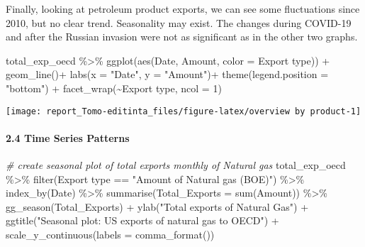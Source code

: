 \documentclass[
]{article}
\newenvironment{Shaded}{\begin{snugshade}}{\end{snugshade}}
\newcommand{\AttributeTok}[1]{\textcolor[rgb]{0.77,0.63,0.00}{#1}}
\newcommand{\CommentTok}[1]{\textcolor[rgb]{0.56,0.35,0.01}{\textit{#1}}}
\newcommand{\DecValTok}[1]{\textcolor[rgb]{0.00,0.00,0.81}{#1}}
\newcommand{\FunctionTok}[1]{\textcolor[rgb]{0.00,0.00,0.00}{#1}}
\newcommand{\NormalTok}[1]{#1}
\newcommand{\SpecialCharTok}[1]{\textcolor[rgb]{0.00,0.00,0.00}{#1}}
\newcommand{\StringTok}[1]{\textcolor[rgb]{0.31,0.60,0.02}{#1}}
\begin{document}
Finally, looking at petroleum product exports, we can see some
fluctuations since 2010, but no clear trend. Seasonality may exist. The
changes during COVID-19 and after the Russian invasion were not as
significant as in the other two graphs.

\begin{Shaded}
\begin{Highlighting}[]
\NormalTok{total\_exp\_oecd }\SpecialCharTok{\%\textgreater{}\%}  
  \FunctionTok{ggplot}\NormalTok{(}\FunctionTok{aes}\NormalTok{(Date, Amount, }\AttributeTok{color =} \StringTok{\textasciigrave{}}\AttributeTok{Export type}\StringTok{\textasciigrave{}}\NormalTok{)) }\SpecialCharTok{+}
  \FunctionTok{geom\_line}\NormalTok{()}\SpecialCharTok{+}
  \FunctionTok{labs}\NormalTok{(}\AttributeTok{x =} \StringTok{"Date"}\NormalTok{, }\AttributeTok{y =} \StringTok{"Amount"}\NormalTok{)}\SpecialCharTok{+}
  \FunctionTok{theme}\NormalTok{(}\AttributeTok{legend.position =} \StringTok{"bottom"}\NormalTok{) }\SpecialCharTok{+}
  \FunctionTok{facet\_wrap}\NormalTok{(}\SpecialCharTok{\textasciitilde{}}\StringTok{\textasciigrave{}}\AttributeTok{Export type}\StringTok{\textasciigrave{}}\NormalTok{, }\AttributeTok{ncol =} \DecValTok{1}\NormalTok{)}
\end{Highlighting}
\end{Shaded}

\begin{center}\texttt{[image: report\_Tomo-editinta\_files/figure-latex/overview by product-1]} \end{center}

\hypertarget{time-series-patterns}{%
\paragraph{2.4 Time Series Patterns}\label{time-series-patterns}}

\begin{Shaded}
\begin{Highlighting}[]
\CommentTok{\# create seasonal plot of total exports monthly of Natural gas}
\NormalTok{total\_exp\_oecd }\SpecialCharTok{\%\textgreater{}\%} \FunctionTok{filter}\NormalTok{(}\StringTok{\textasciigrave{}}\AttributeTok{Export type}\StringTok{\textasciigrave{}} \SpecialCharTok{==} \StringTok{"Amount of Natural gas (BOE)"}\NormalTok{) }\SpecialCharTok{\%\textgreater{}\%} 
  \FunctionTok{index\_by}\NormalTok{(Date) }\SpecialCharTok{\%\textgreater{}\%} 
  \FunctionTok{summarise}\NormalTok{(}\AttributeTok{Total\_Exports =} \FunctionTok{sum}\NormalTok{(}\StringTok{\textasciigrave{}}\AttributeTok{Amount}\StringTok{\textasciigrave{}}\NormalTok{)) }\SpecialCharTok{\%\textgreater{}\%} 
  \FunctionTok{gg\_season}\NormalTok{(Total\_Exports) }\SpecialCharTok{+}
  \FunctionTok{ylab}\NormalTok{(}\StringTok{"Total exports  of Natural Gas"}\NormalTok{) }\SpecialCharTok{+}
  \FunctionTok{ggtitle}\NormalTok{(}\StringTok{"Seasonal plot: US exports of natural gas to OECD"}\NormalTok{) }\SpecialCharTok{+}
  \FunctionTok{scale\_y\_continuous}\NormalTok{(}\AttributeTok{labels =} \FunctionTok{comma\_format}\NormalTok{())}
\end{Highlighting}
\end{Shaded}
\end{document}
